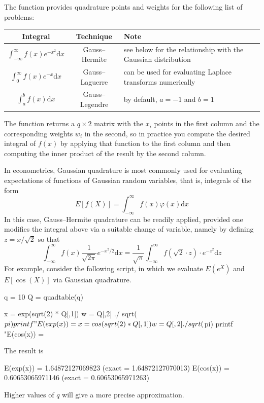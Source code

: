 The  function provides quadrature points and weights
for the following list of problems:
\begin{center}
\begin{tabular}{ccp{}}
  \hline
  \textbf{Integral} & \textbf{Technique} & \textbf{Note}\\
  \hline
  $\int_{-\infty}^{\infty} f(x) e^{-x^2} \mathrm{d}x$ &
  Gauss--Hermite & see below for the relationship with the Gaussian distribution\\
  $\int_{0}^{\infty} f(x) e^{-x} \mathrm{d}x$ &
  Gauss--Laguerre & can be used for evaluating Laplace transforms numerically \\
  $\int_{a}^{b} f(x) \mathrm{d}x$ &
  Gauss--Legendre & by default, $a=-1$ and $b=1$ \\
  \hline
\end{tabular}
\end{center}
The  function returns a $q \times 2$ matrix with the
$x_i$ points in the first column and the corresponding weights $w_i$
in the second, so in practice you compute the desired integral of
$f(x)$ by applying that function to the first column and then
computing the inner product of the result by the second column.

In econometrics, Gaussian quadrature is most commonly used for
evaluating expectations of functions of Gaussian random variables,
that is, integrals of the form
\[
  E\left[f(X)\right] = \int_{-\infty}^{\infty} f(x) \varphi(x)
  \mathrm{d} x
\]
In this case, Gauss--Hermite quadrature can be readily applied,
provided one modifies the integral above via a suitable change of
variable, namely by defining $z = x/\sqrt{2}$ so that
\[
  \int_{-\infty}^{\infty} f(x) \frac{1}{\sqrt{2 \pi}} e^{-x^2/2}
  \mathrm{d} x =
  \frac{1}{\sqrt{\pi}} \int_{-\infty}^{\infty} f(\sqrt{2} \cdot z)
  \cdot  e^{-z^2}
  \mathrm{d} z
\]
For example, consider the following script, in which we evaluate
$E(e^X)$ and $E[\cos(X)]$ via Gaussian quadrature.
\begin{code}
q = 10
Q = quadtable(q)

x = exp(sqrt(2) * Q[,1])
w = Q[,2] ./ sqrt($pi) 
printf "E(exp(x)) = %

x = cos(sqrt(2) * Q[,1])
w = Q[,2] ./ sqrt($pi) 
printf "E(cos(x)) = %
\end{code}
The result is
\begin{code}
E(exp(x)) = 1.64872127069823 (exact = 1.64872127070013)
E(cos(x)) = 0.60653065971146 (exact = 0.60653065971263)
\end{code}
Higher values of $q$ will give a more precise approximation.


